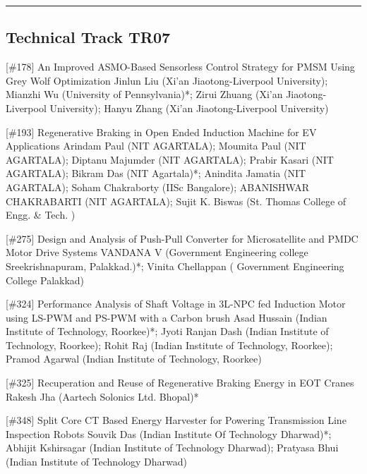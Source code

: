 \hrule  \subsection{Technical Track TR07}\nopagebreak {} \begin{abstract_online} {[\#178] An Improved ASMO-Based Sensorless Control Strategy for PMSM Using Grey Wolf Optimization} {} {Jinlun Liu (Xi’an Jiaotong-Liverpool University); Mianzhi Wu (University of Pennsylvania)*; Zirui Zhuang (Xi’an Jiaotong-Liverpool University); Hanyu Zhang (Xi’an Jiaotong-Liverpool University)} {}  \end{abstract_online} 
{} \begin{abstract_online} {[\#193] Regenerative Braking in Open Ended Induction Machine for EV Applications} {} {Arindam Paul (NIT AGARTALA); Moumita Paul (NIT AGARTALA); Diptanu Majumder (NIT AGARTALA); Prabir Kasari (NIT AGARTALA); Bikram Das (NIT Agartala)*; Anindita Jamatia (NIT AGARTALA); Soham Chakraborty (IISc Bangalore); ABANISHWAR CHAKRABARTI (NIT AGARTALA); Sujit K. Biswas (St. Thomas College of Engg. \& Tech. )} {}  \end{abstract_online} 
{} \begin{abstract_online} {[\#275] Design and Analysis of Push-Pull Converter for  Microsatellite and PMDC Motor Drive Systems} {} {VANDANA  V (Government Engineering college Sreekrishnapuram, Palakkad.)*; Vinita Chellappan ( Government Engineering College Palakkad)} {}  \end{abstract_online} 
{} \begin{abstract_online} {[\#324] Performance Analysis of Shaft Voltage in 3L-NPC fed Induction Motor using LS-PWM and PS-PWM with a Carbon brush} {} {Asad Hussain (Indian Institute of Technology, Roorkee)*; Jyoti Ranjan Dash (Indian Institute of Technology, Roorkee); Rohit Raj (Indian Institute of Technology, Roorkee); Pramod Agarwal (Indian Institute of Technology, Roorkee)} {}  \end{abstract_online} 
{} \begin{abstract_online} {[\#325] Recuperation and Reuse of Regenerative Braking Energy in EOT Cranes} {} {Rakesh  Jha (Aartech Solonics Ltd. Bhopal)*} {}  \end{abstract_online} 
{} \begin{abstract_online} {[\#348] Split Core CT Based Energy Harvester for Powering Transmission Line Inspection Robots} {} {Souvik  Das (Indian Institute Of Technology Dharwad)*; Abhijit  Kshirsagar (Indian Institute of Technology Dharwad); Pratyasa Bhui (Indian Institute of Technology Dharwad)} {}  \end{abstract_online} 
